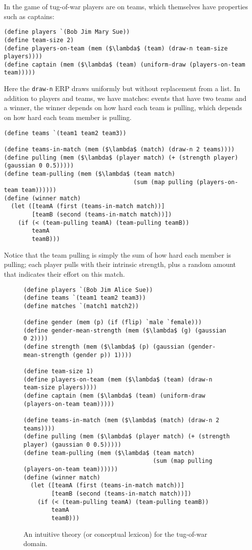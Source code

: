 \documentclass[12pt]{article}
\begin{document}
In the game of tug-of-war players are on teams, which themselves have properties such as captains:
\begin{lstlisting}[mathescape]
(define players `(Bob Jim Mary Sue))
(define team-size 2)
(define players-on-team (mem ($\lambda$ (team) (draw-n team-size players))))
(define captain (mem ($\lambda$ (team) (uniform-draw (players-on-team team)))))
\end{lstlisting}
Here the \lstinline{draw-n} ERP draws uniformly but without replacement from a list.
%
In addition to players and teams, we have matches: events that have two teams and a winner, the winner depends on how hard each team is pulling, which depends on how hard each team member is pulling.
\begin{lstlisting}[mathescape]
(define teams `(team1 team2 team3))

(define teams-in-match (mem ($\lambda$ (match) (draw-n 2 teams))))
(define pulling (mem ($\lambda$ (player match) (+ (strength player) (gaussian 0 0.5)))))
(define team-pulling (mem ($\lambda$ (team match) 
                                     (sum (map pulling (players-on-team team))))))
(define (winner match) 
  (let ([teamA (first (teams-in-match match))]
        [teamB (second (teams-in-match match))])
    (if (< (team-pulling teamA) (team-pulling teamB))
        teamA
        teamB)))
\end{lstlisting}
Notice that the team pulling is simply the sum of how hard each member is pulling; each player pulls with their intrinsic strength, plus a random amount that indicates their effort on this match. 

 
 
 \begin{figure}[tbh]
\begin{center}
 \begin{lstlisting}[mathescape]
(define players `(Bob Jim Alice Sue))
(define teams `(team1 team2 team3))
(define matches `(match1 match2))

(define gender (mem (p) (if (flip) `male `female)))
(define gender-mean-strength (mem ($\lambda$ (g) (gaussian 0 2))))
(define strength (mem ($\lambda$ (p) (gaussian (gender-mean-strength (gender p)) 1))))

(define team-size 1)
(define players-on-team (mem ($\lambda$ (team) (draw-n team-size players))))
(define captain (mem ($\lambda$ (team) (uniform-draw (players-on-team team)))))

(define teams-in-match (mem ($\lambda$ (match) (draw-n 2 teams))))
(define pulling (mem ($\lambda$ (player match) (+ (strength player) (gaussian 0 0.5)))))
(define team-pulling (mem ($\lambda$ (team match) 
                                     (sum (map pulling (players-on-team team))))))
(define (winner match) 
  (let ([teamA (first (teams-in-match match))]
        [teamB (second (teams-in-match match))])
    (if (< (team-pulling teamA) (team-pulling teamB))
        teamA
        teamB)))
\end{lstlisting}
\caption{An intuitive theory (or conceptual lexicon) for the tug-of-war domain.}
\label{theory}
\end{center}
\end{figure} 
 
\end{document}
